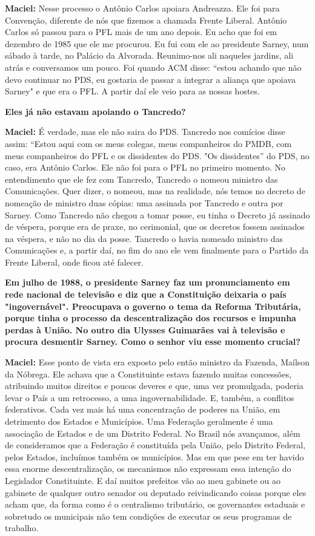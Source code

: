 \textbf{Maciel:} Nesse processo o Antônio Carlos apoiara Andreazza. Ele
foi para Convenção, diferente de nós que fizemos a chamada Frente
Liberal. Antônio Carlos só passou para o PFL mais de um ano depois. Eu
acho que foi em dezembro de 1985 que ele me procurou. Eu fui com ele ao
presidente Sarney, num sábado à tarde, no Palácio da Alvorada.
Reunimo-nos ali naqueles jardins, ali atrás e conversamos um pouco. Foi
quando ACM disse: ``estou achando que não devo continuar no PDS, eu
gostaria de passar a integrar a aliança que apoiava Sarney" e que era o
PFL. A partir daí ele veio para as nossas hostes.

\textbf{Eles já não estavam apoiando o Tancredo? }

\textbf{Maciel:} É verdade, mas ele não saira do PDS. Tancredo nos
comícios disse assim: ``Estou aqui com os meus colegas, meus
companheiros do PMDB, com meus companheiros do PFL e os dissidentes do
PDS. "Os dissidentes'' do PDS, no caso, era Antônio Carlos. Ele não foi
para o PFL no primeiro momento. No entendimento que ele fez com
Tancredo, Tancredo o nomeou ministro das Comunicações. Quer dizer, o
nomeou, mas na realidade, nós temos no decreto de nomeação de ministro
duas cópias: uma assinada por Tancredo e outra por Sarney. Como Tancredo
não chegou a tomar posse, eu tinha o Decreto já assinado de véspera,
porque era de praxe, no cerimonial, que os decretos fossem assinados na
véspera, e não no dia da posse. Tancredo o havia nomeado ministro das
Comunicações e, a partir daí, no fim do ano ele vem finalmente para o
Partido da Frente Liberal, onde ficou até falecer.

\textbf{Em julho de 1988, o presidente Sarney faz um pronunciamento em
rede nacional de televisão e diz que a Constituição deixaria o país
"ingovernável". Preocupava o governo o tema da Reforma Tributária,
porque tinha o processo da descentralização dos recursos e impunha
perdas à União. No outro dia Ulysses Guimarães vai à televisão e procura
desmentir Sarney. Como o senhor viu esse momento crucial? }

\textbf{Maciel:} Esse ponto de vista era exposto pelo então ministro da
Fazenda, Maílson da Nóbrega. Ele achava que a Constituinte estava
fazendo muitas concessões, atribuindo muitos direitos e poucos deveres e
que, uma vez promulgada, poderia levar o País a um retrocesso, a uma
ingovernabilidade. E, também, a conflitos federativos. Cada vez mais há
uma concentração de poderes na União, em detrimento dos Estados e
Municípios. Uma Federação geralmente é uma associação de Estados e de um
Distrito Federal. No Brasil nós avançamos, além de consideramos que a
Federação é constituída pela União, pelo Distrito Federal, pelos
Estados, incluímos também os municípios. Mas em que pese em ter havido
essa enorme descentralização, os mecanismos não expressam essa intenção
do Legislador Constituinte. E daí muitos prefeitos vão ao meu gabinete
ou ao gabinete de qualquer outro senador ou deputado reivindicando
coisas porque eles acham que, da forma como é o centralismo tributário,
os governantes estaduais e sobretudo os municipais não tem condições de
executar os seus programas de trabalho.

